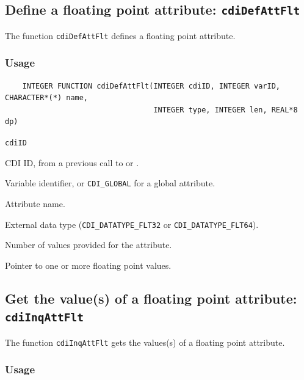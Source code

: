 \subsection{Define a floating point attribute: \texttt{cdiDefAttFlt}}
\label{cdiDefAttFlt}

The function {\texttt{cdiDefAttFlt}} defines a floating point attribute.

\subsubsection*{Usage}

\begin{verbatim}
    INTEGER FUNCTION cdiDefAttFlt(INTEGER cdiID, INTEGER varID, CHARACTER*(*) name, 
                                  INTEGER type, INTEGER len, REAL*8 dp)
\end{verbatim}

\hspace*{4mm}\begin{minipage}[]{15cm}
\begin{deflist}{\texttt{cdiID}\ }
\item[\texttt{cdiID}]
CDI ID, from a previous call to {} or {}.
\item[\texttt{varID}]
Variable identifier, or {\texttt{CDI\_GLOBAL}} for a global attribute.
\item[\texttt{name}]
Attribute name.
\item[\texttt{type}]
External data type ({\texttt{CDI\_DATATYPE\_FLT32}} or {\texttt{CDI\_DATATYPE\_FLT64}}).
\item[\texttt{len}]
Number of values provided for the attribute.
\item[\texttt{dp}]
Pointer to one or more floating point values.

\end{deflist}
\end{minipage}


\subsection{Get the value(s) of a floating point attribute: \texttt{cdiInqAttFlt}}
\label{cdiInqAttFlt}

The function {\texttt{cdiInqAttFlt}} gets the values(s) of a floating point attribute.

\subsubsection*{Usage}

